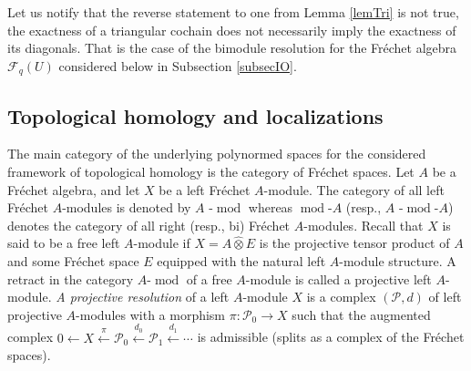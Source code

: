 \documentclass[12pt,reqno]{amsart}%
\theoremstyle{plain}
\numberwithin{theorem}{section} \numberwithin{equation}{section}
\numberwithin{lemma}{section}
\numberwithin{remark}{section}
\numberwithin{example}{section}
\numberwithin{proposition}{section}
\numberwithin{definition}{section}
\numberwithin{corollary}{section}
\begin{document}
Let us notify that the reverse statement to one from Lemma \ref{lemTri} is not
true, the exactness of a triangular cochain does not necessarily imply the
exactness of its diagonals. That is the case of the bimodule resolution for
the Fr\'{e}chet algebra $\mathcal{F}_{q}\left(  U\right)  $ considered below
in Subsection \ref{subsecIO}.

\subsection{Topological homology and localizations\label{subSth}}

The main category of the underlying polynormed spaces for the considered
framework of topological homology is the category of Fr\'{e}chet spaces. Let
$A$ be a Fr\'{e}chet algebra, and let $X$ be a left Fr\'{e}chet $A$-module.
The category of all left Fr\'{e}chet $A$-modules is denoted by $A$%
-$\operatorname*{mod}$ whereas $\operatorname{mod}$-$A$ (resp., $A$%
-$\operatorname{mod}$-$A$) denotes the category of all right (resp., bi)
Fr\'{e}chet $A$-modules. Recall that $X$ is said to be a free left $A$-module
if $X=A\widehat{\otimes}E$ is the projective tensor product of $A$ and some
Fr\'{e}chet space $E$ equipped with the natural left $A$-module structure. A
retract in the category $A$-$\operatorname*{mod}$ of a free $A$-module is
called a projective left $A$-module. \textit{A projective resolution }of a
left $A$-module $X$ is a complex $\left(  \mathcal{P},d\right)  $ of left
projective $A$-modules with a morphism $\pi:\mathcal{P}_{0}\rightarrow X$ such
that the augmented complex $0\leftarrow X\overset{\pi}{\longleftarrow
}\mathcal{P}_{0}\overset{d_{0}}{\longleftarrow}\mathcal{P}_{1}\overset{d_{1}%
}{\longleftarrow}\cdots$ is admissible (splits as a complex of the Fr\'{e}chet spaces).
\end{document}
